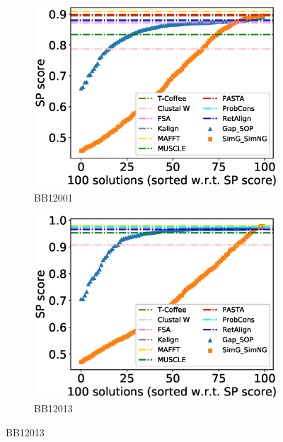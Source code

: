 \begin{figure}[!htbp]
	\centering
	\begin{adjustwidth}{-1.5cm}{-1cm}
		\begin{subfigure}{0.22\textwidth}
			\includegraphics[width=\columnwidth]{Figure/summary/precomputedInit/Balibase/BB12001_pairs_density_single_run_2}
			\caption{BB12001}
		\end{subfigure}	
		\begin{subfigure}{0.22\textwidth}
			\includegraphics[width=\columnwidth]{Figure/summary/precomputedInit/Balibase/BB12013_pairs_density_single_run_2}
			\caption{BB12013}
		\end{subfigure}

\end{adjustwidth}
\end{figure}
